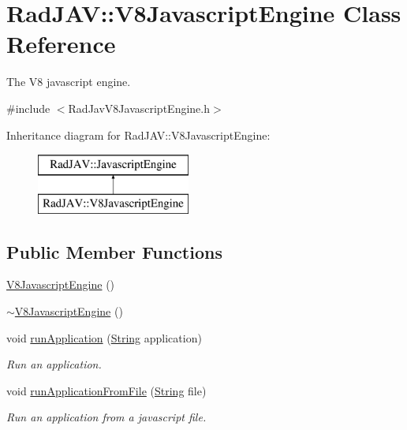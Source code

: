 \hypertarget{class_rad_j_a_v_1_1_v8_javascript_engine}{}\section{Rad\+J\+AV\+:\+:V8\+Javascript\+Engine Class Reference}
\label{class_rad_j_a_v_1_1_v8_javascript_engine}


The V8 javascript engine.  




{\ttfamily \#include $<$Rad\+Jav\+V8\+Javascript\+Engine.\+h$>$}

Inheritance diagram for Rad\+J\+AV\+:\+:V8\+Javascript\+Engine\+:\begin{figure}[H]
\begin{center}
\leavevmode
\includegraphics[height=2.000000cm]{class_rad_j_a_v_1_1_v8_javascript_engine}
\end{center}
\end{figure}
\subsection*{Public Member Functions}
\begin{DoxyCompactItemize}
\item 
\hyperlink{class_rad_j_a_v_1_1_v8_javascript_engine_ae042dd701a9a521642c2b3daffd7b016}{V8\+Javascript\+Engine} ()
\item 
\hyperlink{class_rad_j_a_v_1_1_v8_javascript_engine_a067369088e8eb2727ed8816d949868a7}{$\sim$\+V8\+Javascript\+Engine} ()
\item 
void \hyperlink{class_rad_j_a_v_1_1_v8_javascript_engine_a5995ed0d4417b6e9ff36a77a540ff911}{run\+Application} (\hyperlink{class_rad_j_a_v_1_1_string}{String} application)
\begin{DoxyCompactList}\small\item\em Run an application. \end{DoxyCompactList}\item 
void \hyperlink{class_rad_j_a_v_1_1_v8_javascript_engine_aa0d9d2f20abcf434f8986f7417ebcc3e}{run\+Application\+From\+File} (\hyperlink{class_rad_j_a_v_1_1_string}{String} file)
\begin{DoxyCompactList}\small\item\em Run an application from a javascript file. \end{DoxyCompactList}\end{DoxyCompactItemize}
